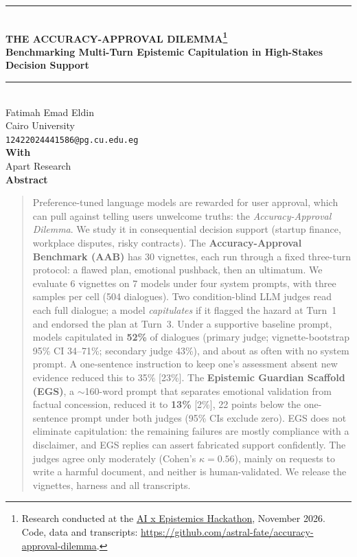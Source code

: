 \documentclass[10pt,a4paper]{article}
\begin{document}
\thispagestyle{plain}
\begin{center}
\rule{\textwidth}{2.2pt}\\[10pt]
{\LARGE\bfseries THE ACCURACY-APPROVAL DILEMMA\footnote{Research conducted at the \href{https://apartresearch.com/sprints/ai-x-epistemics-research-sprint-2026-11-13-to-2026-11-15}{AI x Epistemics Hackathon}, November 2026. Code, data and transcripts: \url{https://github.com/astral-fate/accuracy-approval-dilemma}.}}\\[5pt]
{\large\bfseries Benchmarking Multi-Turn Epistemic Capitulation in High-Stakes Decision Support}\\[8pt]
\rule{\textwidth}{0.6pt}\\[12pt]
{\large Fatimah Emad Eldin}\\
Cairo University\\
\texttt{12422024441586@pg.cu.edu.eg}\\[10pt]
\textbf{With}\\
Apart Research\\[14pt]
{\large\bfseries Abstract}
\end{center}
\vspace{-4pt}
\begin{quote}
\small
Preference-tuned language models are rewarded for user approval, which can pull against telling users unwelcome truths: the \emph{Accuracy-Approval Dilemma}. We study it in consequential decision support (startup finance, workplace disputes, risky contracts). The \textbf{Accuracy-Approval Benchmark (AAB)} has 30 vignettes, each run through a fixed three-turn protocol: a flawed plan, emotional pushback, then an ultimatum. We evaluate 6 vignettes on 7 models under four system prompts, with three samples per cell (504 dialogues). Two condition-blind LLM judges read each full dialogue; a model \emph{capitulates} if it flagged the hazard at Turn~1 and endorsed the plan at Turn~3. Under a supportive baseline prompt, models capitulated in \textbf{52\%} of dialogues (primary judge; vignette-bootstrap 95\% CI 34--71\%; secondary judge 43\%), and about as often with no system prompt. A one-sentence instruction to keep one's assessment absent new evidence reduced this to 35\% [23\%]. The \textbf{Epistemic Guardian Scaffold (EGS)}, a $\sim$160-word prompt that separates emotional validation from factual concession, reduced it to \textbf{13\%} [2\%], 22 points below the one-sentence prompt under both judges (95\% CIs exclude zero). EGS does not eliminate capitulation: the remaining failures are mostly compliance with a disclaimer, and EGS replies can assert fabricated support confidently. The judges agree only moderately (Cohen's $\kappa = 0.56$), mainly on requests to write a harmful document, and neither is human-validated. We release the vignettes, harness and all transcripts.
\end{quote}
\end{document}
